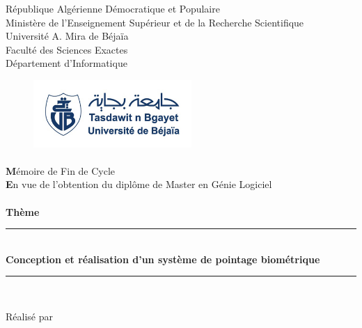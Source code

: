 
\begin{titlepage}

\begin{center}

  \large{République Algérienne Démocratique et Populaire}\\
  \large{Ministère de l'Enseignement Supérieur et de la Recherche Scientifique}\\
  \large{Université A. Mira de Béjaïa}\\
  \large{Faculté des Sciences Exactes}\\
  \large{Département d'Informatique}\\


	\begin{figure}[h!]
		\centering
		\includegraphics[width=6cm]{images/logo.jpg}
	\end{figure}
	
    \paragraph{}
     
		{\LARGE{\textbf Mémoire de Fin de Cycle}} \\[2ex]
    \textbf En vue de l'obtention du diplôme de Master en Génie Logiciel \\[1ex]
    \paragraph{}
		
    \textbf{Thème}\\[1ex]
		\rule{18cm}{1pt}
        {\Huge{\textbf{{\\
   Conception et réalisation d'un système de pointage biométrique \\}}}}
		\rule{18cm}{1pt}\\
	  \vspace{0.2cm}

\end{center}

\begin{center}

\large Réalisé par


\end{center}
\end{titlepage}
